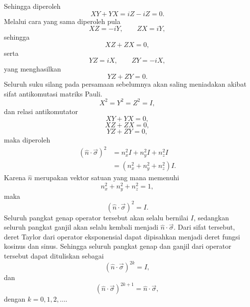 Sehingga diperoleh
\begin{equation}
XY+YX=iZ-iZ=0.
\end{equation}
Melalui cara yang sama diperoleh pula
\begin{equation}
XZ=-iY,\qquad
ZX=iY,
\end{equation}
sehingga
\begin{equation}
XZ+ZX=0,
\end{equation}
serta
\begin{equation}
YZ=iX,\qquad
ZY=-iX,
\end{equation}
yang menghasilkan
\begin{equation}
YZ+ZY=0.
\end{equation}
Seluruh suku silang pada persamaan sebelumnya akan saling meniadakan akibat sifat antikomutasi matriks Pauli.
\begin{equation}
X^2=Y^2=Z^2=I,
\end{equation}
dan relasi antikomutator
\begin{equation}
XY+YX=0,
\end{equation}
\begin{equation}
XZ+ZX=0,
\end{equation}
\begin{equation}
YZ+ZY=0,
\end{equation}
maka diperoleh
\begin{equation}
\begin{aligned}
(\hat{n}\cdot\vec{\sigma})^2
&=
n_x^2I+n_y^2I+n_z^2I \\
&=
(n_x^2+n_y^2+n_z^2)I.
\end{aligned}
\end{equation}
Karena $\hat n$ merupakan vektor satuan yang mana memenuhi
\begin{equation}
n_x^2+n_y^2+n_z^2=1,
\end{equation}
maka
\begin{equation}
(\hat{n}\cdot\vec{\sigma})^2=I.
\end{equation}
Seluruh pangkat genap operator tersebut akan selalu bernilai $I$, sedangkan seluruh pangkat ganjil akan selalu kembali menjadi $\hat n\cdot\vec\sigma$. Dari sifat tersebut, deret Taylor dari operator eksponensial dapat dipisahkan menjadi deret fungsi kosinus dan sinus. Sehingga seluruh pangkat genap dan ganjil dari operator tersebut dapat dituliskan sebagai
\begin{equation}
(\hat{n}\cdot\vec{\sigma})^{2k}=I,
\end{equation}
dan
\begin{equation}
(\hat{n}\cdot\vec{\sigma})^{2k+1}
=
\hat{n}\cdot\vec{\sigma},
\end{equation}
dengan $k=0,1,2,\ldots$.

